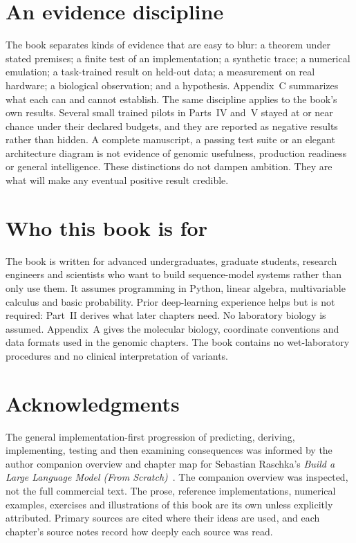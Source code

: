 \section*{An evidence discipline}
The book separates kinds of evidence that are easy to blur: a theorem under stated
premises; a finite test of an implementation; a synthetic trace; a numerical emulation; a
task-trained result on held-out data; a measurement on real hardware; a biological
observation; and a hypothesis. Appendix~C summarizes what each can and cannot establish.
The same discipline applies to the book's own results. Several small trained pilots in
Parts~IV and~V stayed at or near chance under their declared budgets, and they are
reported as negative results rather than hidden. A complete manuscript, a passing test suite or an
elegant architecture diagram is not evidence of genomic usefulness, production readiness
or general intelligence. These distinctions do not dampen ambition. They are what will
make any eventual positive result credible.

\section*{Who this book is for}
The book is written for advanced undergraduates, graduate students, research engineers
and scientists who want to build sequence-model systems rather than only use them. It
assumes programming in Python, linear algebra, multivariable calculus and basic
probability. Prior deep-learning experience helps but is not required: Part~II derives
what later chapters need. No laboratory biology is assumed. Appendix~A gives the
molecular biology, coordinate conventions and data formats used in the genomic chapters.
The book contains no wet-laboratory procedures and no clinical interpretation of
variants.

\section*{Acknowledgments}
The general implementation-first progression of predicting, deriving, implementing,
testing and then examining consequences was informed by the author companion overview and
chapter map for Sebastian Raschka's \emph{Build a Large Language Model (From
Scratch)}~\cite{raschkaoverview}. The companion overview was inspected, not the full
commercial text. The prose, reference implementations, numerical examples, exercises and
illustrations of this book are its own unless explicitly attributed. Primary sources are
cited where their ideas are used, and each chapter's source notes record how deeply each
source was read.
